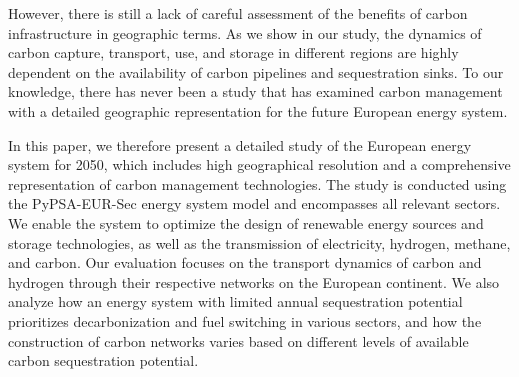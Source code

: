 However, there is still a lack of careful assessment of the benefits of carbon infrastructure in geographic terms. As we show in our study, the dynamics of carbon capture, transport, use, and storage in different regions are highly dependent on the availability of carbon pipelines and sequestration sinks. To our knowledge, there has never been a study that has examined carbon management with a detailed geographic representation for the future European energy system.

In this paper, we therefore present a detailed study of the European energy system for 2050, which includes high geographical resolution and a comprehensive representation of carbon management technologies. The study is conducted using the PyPSA-EUR-Sec energy system model and encompasses all relevant sectors. We enable the system to optimize the design of renewable energy sources and storage technologies, as well as the transmission of electricity, hydrogen, methane, and carbon. Our evaluation focuses on the transport dynamics of carbon and hydrogen through their respective networks on the European continent. We also analyze how an energy system with limited annual sequestration potential prioritizes decarbonization and fuel switching in various sectors, and how the construction of carbon networks varies based on different levels of available carbon sequestration potential.
